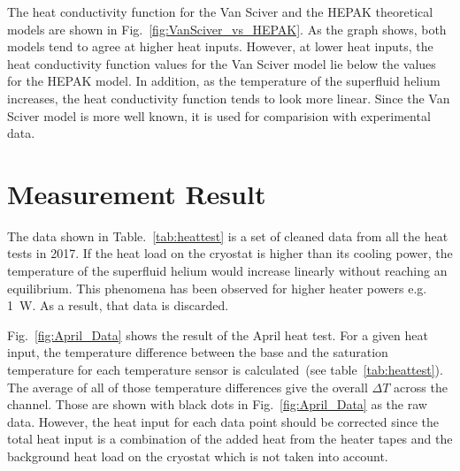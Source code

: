 The heat conductivity function for the Van Sciver and the HEPAK
theoretical models are shown in Fig.~\ref{fig:VanSciver_vs_HEPAK}. As
the graph shows, both models tend to agree at higher heat
inputs. However, at lower heat inputs, the heat conductivity function
values for the Van Sciver model lie below the values for the HEPAK
model. In addition, as the temperature of the superfluid helium
increases, the heat conductivity function tends to look more
linear. Since the Van Sciver model is more well known, it is used for
comparision with experimental data.

\section{Measurement Result}
The data shown in Table.~\ref{tab:heattest} is a set of cleaned data
from all the heat tests in 2017. If the heat load on the cryostat is
higher than its cooling power, the temperature of the superfluid
helium would increase linearly without reaching an equilibrium. This
phenomena has been observed for higher heater powers e.g. 1~W. As a
result, that data is discarded.


Fig.~\ref{fig:April_Data} shows the result of the April heat test.
For a given heat input, the temperature difference between the base
and the saturation temperature for each temperature sensor is
calculated~(see table~\ref{tab:heattest}). The average of all of those
temperature differences give the overall $\Delta T$ across the
channel. Those are shown with black dots in Fig.~\ref{fig:April_Data}
as the raw data. However, the heat input for each data point should be
corrected since the total heat input is a combination of the added
heat from the heater tapes and the background heat load on the
cryostat which is not taken into account.


